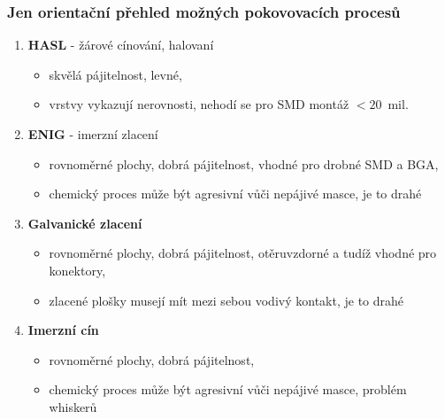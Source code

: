 \documentclass{beamer}
\begin{document}
\begin{frame}
	\frametitle{Jen orientační přehled možných pokovovacích procesů}

\begin{enumerate}
	\item \textbf{HASL} - žárové cínování, halovaní
	\begin{itemize}
		\item skvělá pájitelnost, levné,
		\item vrstvy vykazují nerovnosti, nehodí se pro SMD montáž $<20$~mil.
	\end{itemize}
	
  \item \textbf{ENIG} - imerzní zlacení
	
	\begin{itemize}
		\item rovnoměrné plochy, dobrá pájitelnost, vhodné pro drobné SMD a BGA,
		\item chemický proces může být agresivní vůči nepájivé masce, je to drahé
	\end{itemize}
	
	\item \textbf{Galvanické zlacení}
	\begin{itemize}
		\item rovnoměrné plochy, dobrá pájitelnost, otěruvzdorné a tudíž vhodné pro konektory,
		\item zlacené plošky musejí mít mezi sebou vodivý kontakt, je to drahé
	\end{itemize}
	
	\item \textbf{Imerzní cín}
	
	\begin{itemize}
		\item rovnoměrné plochy, dobrá pájitelnost,
		\item chemický proces může být agresivní vůči nepájivé masce, problém whiskerů
	\end{itemize}
	
\end{enumerate}
	
\end{frame}

\end{document}
